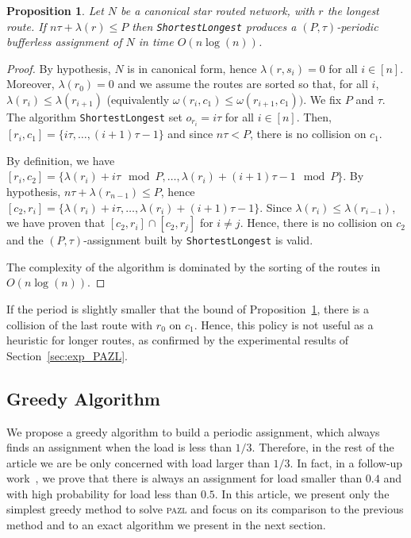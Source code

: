\documentclass[a4paper,10pt]{journal}
\newcommand\shortestlongest{\texttt{ShortestLongest}\xspace}
\newtheorem{proposition}{Proposition}
\newcommand\pazl{\textsc{pazl}\xspace}
\begin{document}
      \begin{proposition} Let $N$ be a canonical star routed network, with $r$ the longest route. If $n\tau + \lambda(r) \leq P$ then \shortestlongest produces a $(P,\tau)$-periodic bufferless assignment of $N$ in time $O(n\log(n))$.\label{prop:SL}
      \end{proposition}
      \begin{proof}
       By hypothesis, $N$ is in canonical form, hence $\lambda(r,s_i) = 0$ for all $i \in [n]$. Moreover, $\lambda(r_0) = 0$ and we assume the routes are sorted so that, for all $i$, $\lambda(r_i) \leq \lambda(r_{i+1})$ (equivalently $\omega(r_i,c_1) \leq \omega(r_{i+1},c_1))$. We fix $P$ and $\tau$. The algorithm \shortestlongest set $o_{r_i} = i\tau$ for all $i \in [n]$. Then, $[r_{i},c_1] = \{i\tau,\dots, (i+1)\tau -1\}$ and since $n\tau < P$, there is no collision on $c_1$. 

       By definition, we have  $[r_{i},c_2] = \{\lambda(r_{i}) + i\tau \mod P, \dots, \lambda(r_{i}) + (i+1)\tau -1 \mod P\}$. By hypothesis, $n\tau + \lambda(r_{n-1}) \leq P$, hence $[c_2,r_{i}] = \{\lambda(r_{i}) + i\tau, \dots, \lambda(r_{i}) + (i+1)\tau -1\}$. Since  $\lambda(r_i) \leq \lambda(r_{i-1})$, we have proven that $[c_2,r_{i}] \cap [c_2,r_{j}]$ for $i \neq j$. Hence, there is no collision on $c_2$ and the $(P,\tau)$-assignment built by \shortestlongest is valid.

 		The complexity of the algorithm is dominated by the sorting of the routes in $O(n\log(n))$. 
      \end{proof}

      If the period is slightly smaller that the bound of Proposition~\ref{prop:SL}, there is a collision of the last route with $r_0$ on $c_1$. Hence, this policy is not useful as a heuristic for longer routes, as confirmed by the experimental results of Section~\ref{sec:exp_PAZL}. 

   
    \subsection{Greedy Algorithm}
    

     We propose a greedy algorithm to build a periodic assignment, which always finds an assignment when the load is less than $1/3$. Therefore, in the rest of the article we are be only concerned with load larger than $1/3$. In fact, in a follow-up work~\cite{guiraud2020scheduling}, we prove that there is always an assignment for load smaller than $0.4$ and with high probability for load less than $0.5$. In this article, we present only the simplest greedy method to solve \pazl and focus on its comparison to the previous method and to an exact algorithm we present in the next section.   
\end{document}
